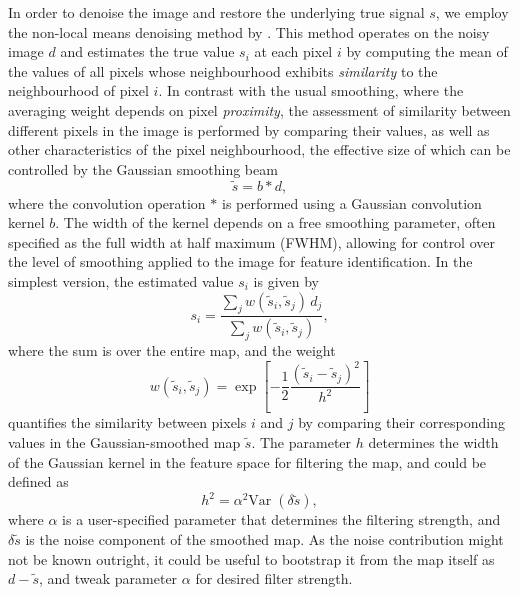 \documentclass{aa}
\newcommand{\var}[1]{{\textrm{Var}\;\!(#1)}}
\begin{document}
In order to denoise the image and restore the underlying true signal $s$, we employ the non-local means denoising method by \cite{Buades:2005}. This method operates on the noisy image $d$ and estimates the true value $s_i$ at each pixel $i$ by computing the mean of the values of all pixels whose neighbourhood exhibits \textit{similarity} to the neighbourhood of pixel $i$. In contrast with the usual smoothing, where the averaging weight depends on pixel \textit{proximity}, the assessment of similarity between different pixels in the image is performed by comparing their values, as well as other characteristics of the pixel neighbourhood, the effective size of which can be controlled by the Gaussian smoothing beam
%
\begin{equation}
  \tilde{s} = b*d,
\end{equation}
%
where the convolution operation $*$ is performed using a Gaussian convolution kernel $b$. The width of the kernel depends on a free smoothing parameter, often specified as the full width at half maximum (FWHM), allowing for control over the level of smoothing applied to the image for feature identification. In the simplest version, the estimated value $s_i$ is given by
%
\begin{equation}\label{2.3}
    s_{i}=\frac{\sum_{j}w(\tilde{s}_{i},\tilde{s}_{j})\,d_{j}}{\sum_{j}w(\tilde{s}_{i},\tilde{s}_{j})} ,
\end{equation}
%
where the sum is over the entire map, and the weight
%
\begin{equation}\label{2.4}
    w(\tilde{s}_{i},\tilde{s}_{j})=\exp\left[-\frac{1}{2}\frac{(\tilde{s}_{i}-\tilde{s}_{j})^{2}}{h^{2}}\right]
\end{equation}
%
quantifies the similarity between pixels $i$ and $j$ by comparing their corresponding values in the Gaussian-smoothed map $\tilde{s}$. The parameter $h$ determines the width of the Gaussian kernel in the feature space for filtering the map, and could be defined as
%
\begin{equation}
    h^{2}=\alpha^{2}\var{\delta\tilde{s}},
\end{equation}
%
where $\alpha$ is a user-specified parameter that determines the filtering strength, and $\delta\tilde{s}$ is the noise component of the smoothed map. As the noise contribution might not be known outright, it could be useful to bootstrap it from the map itself as $d-\tilde{s}$, and tweak parameter $\alpha$ for desired filter strength.
\end{document}
